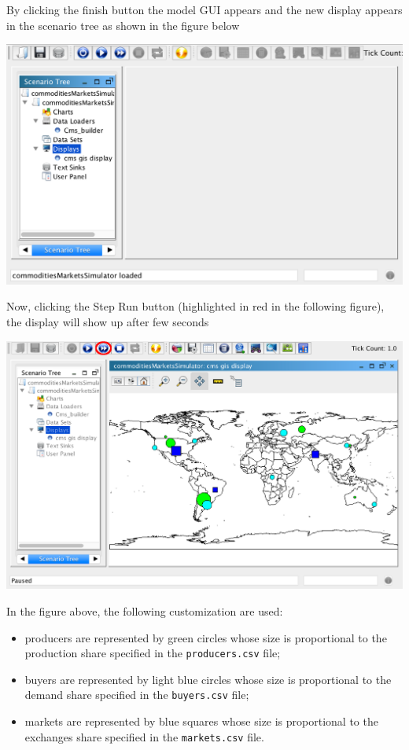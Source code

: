 \documentclass{article}
\begin{document}
By clicking the finish button the model GUI appears and the new display appears in the scenario tree as shown in the figure below

\includegraphics[scale=0.35]{fig_cms_rs_gis9}

Now, clicking the Step Run button (highlighted in red in the following figure), the display will show up after few seconds 

\includegraphics[scale=0.35]{fig_cms_rs_gis10}

In the figure above, the following customization are used:
\begin{itemize}
	\item producers are represented by green circles whose size is proportional to the production share specified in the \verb+producers.csv+ file;
	\item buyers are represented by light blue circles whose size is proportional to the demand share specified in the \verb+buyers.csv+ file;
	\item markets are represented by blue squares whose size is proportional to the exchanges share specified in the \verb+markets.csv+ file.
\end{itemize}
\end{document}
